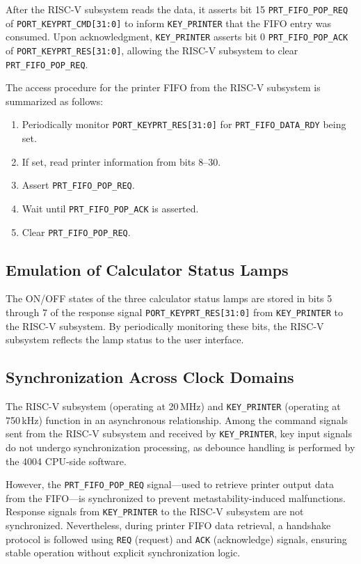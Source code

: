 After the RISC-V subsystem reads the data, it asserts bit 15 \texttt{PRT\_FIFO\_POP\_REQ} of \texttt{PORT\_KEYPRT\_CMD[31:0]} to inform \texttt{KEY\_PRINTER} that the FIFO entry was consumed. Upon acknowledgment, \texttt{KEY\_PRINTER} asserts bit 0 \texttt{PRT\_FIFO\_POP\_ACK} of \texttt{PORT\_KEYPRT\_RES[31:0]}, allowing the RISC-V subsystem to clear \texttt{PRT\_FIFO\_POP\_REQ}.

The access procedure for the printer FIFO from the RISC-V subsystem is summarized as follows:

\begin{enumerate}
  \item Periodically monitor \texttt{PORT\_KEYPRT\_RES[31:0]} for \texttt{PRT\_FIFO\_DATA\_RDY} being set.
  \item If set, read printer information from bits 8--30.
  \item Assert \texttt{PRT\_FIFO\_POP\_REQ}.
  \item Wait until \texttt{PRT\_FIFO\_POP\_ACK} is asserted.
  \item Clear \texttt{PRT\_FIFO\_POP\_REQ}.
\end{enumerate}

\subsection{Emulation of Calculator Status Lamps}
The ON/OFF states of the three calculator status lamps are stored in bits 5 through 7 of the response signal \texttt{PORT\_KEYPRT\_RES[31:0]} from \texttt{KEY\_PRINTER} to the RISC-V subsystem. By periodically monitoring these bits, the RISC-V subsystem reflects the lamp status to the user interface.

\subsection{Synchronization Across Clock Domains}
The RISC-V subsystem (operating at 20\,MHz) and \texttt{KEY\_PRINTER} (operating at 750\,kHz) function in an asynchronous relationship. Among the command signals sent from the RISC-V subsystem and received by \texttt{KEY\_PRINTER}, key input signals do not undergo synchronization processing, as debounce handling is performed by the 4004 CPU-side software.

However, the \texttt{PRT\_FIFO\_POP\_REQ} signal—used to retrieve printer output data from the FIFO—is synchronized to prevent metastability-induced malfunctions. Response signals from \texttt{KEY\_PRINTER} to the RISC-V subsystem are not synchronized. Nevertheless, during printer FIFO data retrieval, a handshake protocol is followed using \texttt{REQ} (request) and \texttt{ACK} (acknowledge) signals, ensuring stable operation without explicit synchronization logic.

